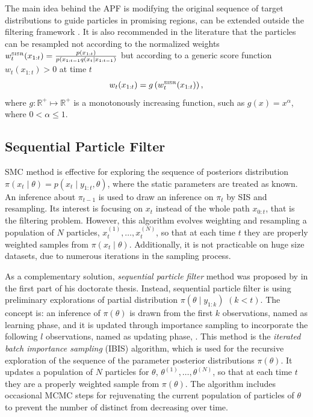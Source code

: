 The main idea behind the APF is modifying the original sequence of target distributions to guide particles in promising regions, can be extended outside the filtering framework \citep{JOHANSEN20081498}. It is also recommended in the literature \citep{liu2008monte} that the particles can be resampled not according to the normalized weights $w_t^{\mbox{\tiny SISR}}(x_{1:t})=\frac{p(x_{1:t})}{ p(x_{1:t-1}q(x_t\mid x_{1:t-1})  }$  but according to a generic score function $w_t(x_{1:t})>0$ at time $t$
\begin{equation*}
w_t(x_{1:t}) = g\left(w_t^{\mbox{\tiny SISR}}(x_{1:t})\right),
\end{equation*}
where $g: \mathbb{R}^+\mapsto \mathbb{R}^+$ is a monotonously increasing function, such as $g(x)=x^\alpha$, where $0<\alpha\leq 1$. 



\subsection{Sequential Particle Filter}


SMC method is effective for exploring the sequence of posteriors distribution  $\pi(x_t\mid\theta) = p(x_t\mid y_{1:t},\theta)$, where the static parameters are treated as known. An inference about $\pi_{t-1}$ is used to draw an inference on $\pi_t$ by SIS and resampling. Its interest is focusing on $x_t$ instead of the whole path $x_{0:t}$, that is the filtering problem. However, this algorithm evolves weighting and resampling a population of $N$ particles, $x_t^{(1)},\ldots,x_t^{(N)}$, so that at each time $t$ they are properly weighted samples from $\pi(x_t \mid \theta)$. Additionally, it is not practicable on huge size datasets, due to numerous iterations in the sampling process. 

As a complementary solution, \textit{sequential particle filter} method was proposed by \cite{chopin2002sequential} in the first part of his doctorate thesis. Instead, sequential particle filter is using preliminary explorations of partial distribution $\pi(\theta\mid y_{1:k})$ $(k<t)$. The concept is: an inference of $\pi(\theta)$ is drawn from the first $k$ observations, named as learning phase, and it is updated through importance sampling to incorporate the following $l$ observations, named as updating phase, \citep{chopin2002sequential}.  This method is the \textit{iterated batch importance sampling} (IBIS) algorithm, which is used for the recursive exploration of the sequence of the parameter posterior distributions $\pi(\theta)$. It updates a population of $N$ particles for $\theta$, $\theta^{(1)}, \ldots, \theta^{(N)}$, so that at each time $t$ they are a properly weighted sample from $\pi(\theta)$. The algorithm includes occasional MCMC steps for rejuvenating the current population of particles of $\theta$  to prevent the number of distinct from decreasing over time. 

